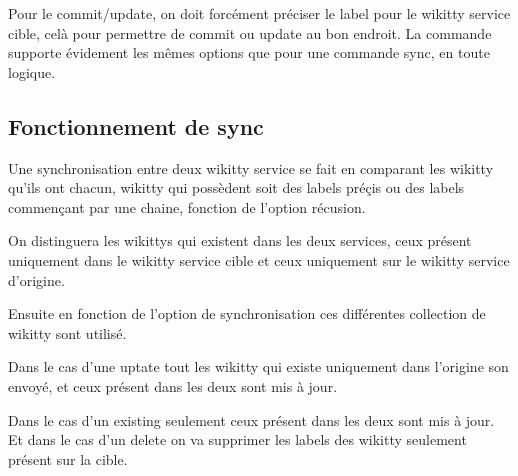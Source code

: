 Pour le commit/update, on doit forcément préciser le label pour le wikitty 
service cible, celà pour permettre de commit ou update au bon endroit.
La commande supporte évidement les mêmes options que pour une commande sync, en
toute logique.


\subsection{Fonctionnement de sync}


Une synchronisation entre deux wikitty service se fait en comparant les wikitty
qu'ils ont chacun, wikitty qui possèdent soit des labels préçis ou des labels
commençant par une chaine, fonction de l'option récusion.

On distinguera les wikittys qui existent dans les deux services, ceux présent
uniquement dans le wikitty service cible et ceux uniquement sur le wikitty
service d'origine.

Ensuite en fonction de l'option de synchronisation ces différentes collection de
wikitty sont utilisé.

Dans le cas d'une uptate tout les wikitty qui existe uniquement dans l'origine
son envoyé, et ceux présent dans les deux sont mis à jour.

Dans le cas d'un existing seulement ceux présent dans les deux sont mis à jour.
Et dans le cas d'un delete on va supprimer les labels des wikitty seulement
présent sur la cible.

